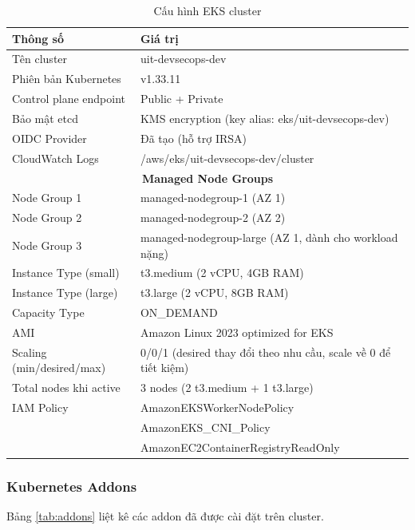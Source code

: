 \documentclass[13pt,a4paper,twoside]{extarticle}
\begin{document}
\begin{table}[H]
\centering
\begin{tabular}{@{}p{5cm} p{10cm}@{}}
\toprule
\textbf{Thông số} & \textbf{Giá trị} \\
\midrule
Tên cluster & uit-devsecops-dev \\
Phiên bản Kubernetes & v1.33.11 \\
Control plane endpoint & Public + Private \\
Bảo mật etcd & KMS encryption (key alias: eks/uit-devsecops-dev) \\
OIDC Provider & Đã tạo (hỗ trợ IRSA) \\
CloudWatch Logs & /aws/eks/uit-devsecops-dev/cluster \\
\midrule
\multicolumn{2}{c}{\textbf{Managed Node Groups}} \\
\midrule
Node Group 1 & managed-nodegroup-1 (AZ 1) \\
Node Group 2 & managed-nodegroup-2 (AZ 2) \\
Node Group 3 & managed-nodegroup-large (AZ 1, dành cho workload nặng) \\
Instance Type (small) & t3.medium (2 vCPU, 4GB RAM) \\
Instance Type (large) & t3.large (2 vCPU, 8GB RAM) \\
Capacity Type & ON\_DEMAND \\
AMI & Amazon Linux 2023 optimized for EKS \\
Scaling (min/desired/max) & 0/0/1 (desired thay đổi theo nhu cầu, scale về 0 để tiết kiệm) \\
Total nodes khi active & 3 nodes (2 t3.medium + 1 t3.large) \\
IAM Policy & AmazonEKSWorkerNodePolicy \\
 & AmazonEKS\_CNI\_Policy \\
 & AmazonEC2ContainerRegistryReadOnly \\
\bottomrule
\end{tabular}
\caption{Cấu hình EKS cluster}
\label{tab:eks-config}
\end{table}

\subsubsection{Kubernetes Addons}

Bảng \ref{tab:addons} liệt kê các addon đã được cài đặt trên cluster.
\end{document}
